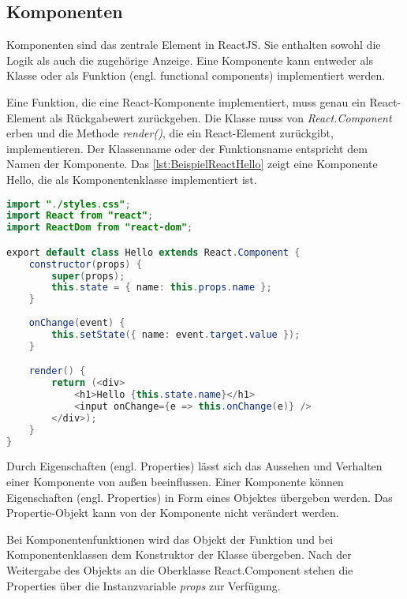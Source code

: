 \subsection{Komponenten}\label{sec:reactKomponenten}


Komponenten sind das zentrale Element in ReactJS. Sie enthalten sowohl die Logik als auch die zugehörige Anzeige. Eine Komponente kann entweder als Klasse oder als Funktion (engl. functional components) implementiert werden. 

Eine Funktion, die eine React-Komponente implementiert, muss genau ein React-Element als Rückgabewert zurückgeben. Die Klasse muss von \textit{React.Component} erben und die Methode \textit{render()}, die ein React-Element zurückgibt, implementieren. Der Klassenname oder der Funktionsname entspricht dem Namen der Komponente.\autocite[vgl.][80\psqq]{Zeigermann.2016} Das \autoref{lst:BeispielReactHello} zeigt eine Komponente Hello, die als Komponentenklasse implementiert ist. 


\begin{lstlisting}[caption=Beispiel React-Anwendung: Die Komponente Hello, label=lst:BeispielReactHello, language=Java]
import "./styles.css";
import React from "react";
import ReactDom from "react-dom";

export default class Hello extends React.Component {
	constructor(props) {
		super(props);
		this.state = { name: this.props.name };
	}
	
	onChange(event) {
		this.setState({ name: event.target.value });
	}

	render() {
		return (<div>
			<h1>Hello {this.state.name}</h1>
			<input onChange={e => this.onChange(e)} />
		</div>);
	}
}
\end{lstlisting}

Durch Eigenschaften (engl. Properties) lässt sich das Aussehen und Verhalten einer Komponente von außen beeinflussen. Einer Komponente können Eigenschaften (engl. Properties) in Form eines Objektes übergeben werden. Das Propertie-Objekt kann von der Komponente nicht verändert werden. 

Bei Komponentenfunktionen wird das Objekt der Funktion und bei Komponentenklassen dem Konstruktor der Klasse übergeben. Nach der Weitergabe des Objekts an die Oberklasse React.Component stehen die Properties über die Instanzvariable \textit{props} zur Verfügung. \autocites[vgl.][24\psq,83-88]{Zeigermann.2016}[vgl.][12-17]{Stefanov.2017}

